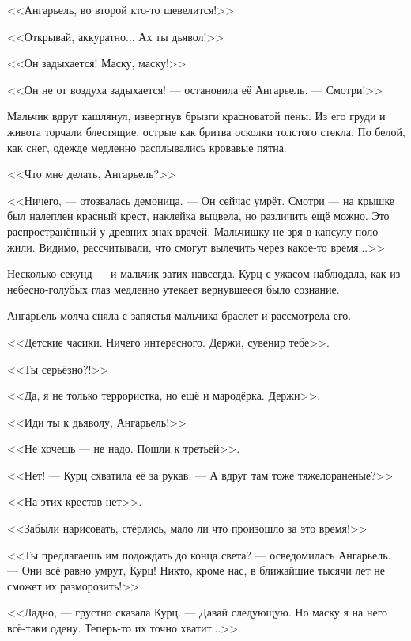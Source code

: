 \documentclass[a4paper,12pt,fleqn]{book}\usepackage{polyglossia}\setdefaultlanguage[babelshorthands=true]{russian}\setotherlanguage{english}\defaultfontfeatures{Ligatures=TeX,Mapping=tex-text}\usepackage{xcolor}\newcommand{\ml}[3]{#2}
\begin{document}
<<Ангарьель, во второй кто-то шевелится!>>

<<Открывай, аккуратно... Ах ты дьявол!>>

<<Он задыхается!
Маску, маску!>>

<<Он не от воздуха задыхается! --- остановила её Ангарьель.
--- Смотри!>>

Мальчик вдруг кашлянул, извергнув брызги красноватой пены.
Из его груди и живота торчали блестящие, острые как бритва осколки толстого стекла.
По белой, как снег, одежде медленно расплывались кровавые пятна.

<<Что мне делать, Ангарьель?>>

<<Ничего, --- отозвалась демоница.
--- Он сейчас умрёт.
Смотри --- на крышке был налеплен красный крест, наклейка выцвела, но различить ещё можно.
Это распространённый у древних знак врачей.
Мальчишку не зря в капсулу положили.
Видимо, рассчитывали, что смогут вылечить через какое-то время...>>

Несколько секунд --- и мальчик затих навсегда.
Курц с ужасом наблюдала, как из небесно-голубых глаз медленно утекает вернувшееся было сознание.

Ангарьель молча сняла с запястья мальчика браслет и рассмотрела его.

\ml{$0$}
{<<Детские часики.}
{``A children watch.}
\ml{$0$}
{Ничего интересного.}
{Zero percent interest.}
Держи, сувенир тебе>>.

\ml{$0$}
{<<Ты серьёзно?!>>}
{``Seriously!''}

\ml{$0$}
{<<Да, я не только террористка, но ещё и мародёрка.}
{``Yes, I'm not only a terrorist, but a marauder too.}
Держи>>.

\ml{$0$}
{<<Иди ты к дьяволу, Ангарьель!>>}
{``Fuck yourself, Angariel!''}

\ml{$0$}
{<<Не хочешь --- не надо.}
{``Take it, or leave it.}
Пошли к третьей>>.

<<Нет! --- Курц схватила её за рукав.
--- А вдруг там тоже тяжелораненые?>>

<<На этих крестов нет>>.

<<Забыли нарисовать, стёрлись, мало ли что произошло за это время!>>

<<Ты предлагаешь им подождать до конца света? --- осведомилась Ангарьель.
--- Они всё равно умрут, Курц!
Никто, кроме нас, в ближайшие тысячи лет не сможет их разморозить!>>

<<Ладно, --- грустно сказала Курц.
--- Давай следующую.
Но маску я на него всё-таки одену.
Теперь-то их точно хватит...>>
\end{document}
